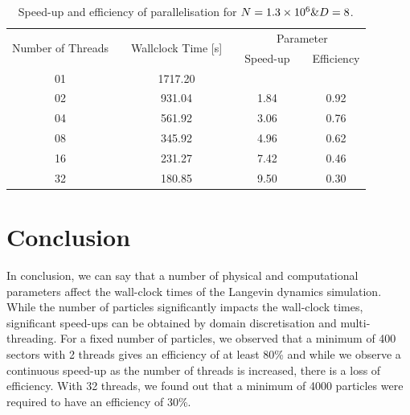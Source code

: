 \documentclass[11pt, oneside]{article}
\begin{document}
                \begin{table}[h]
  \caption{Speed-up and efficiency of parallelisation for $N = \num{1.3d6} \text{\&} D = 8$.}
  \label{tab:measures}
  \centering
  \begin{tabular}{ccccccc}
    \toprule
    \multirow{2}{*}{Number of Threads} &\phantom{abc} & \multirow{2}{*}{Wallclock Time [s]} &\phantom{abc} & \multicolumn{3}{c}{Parameter} \\
    \cmidrule{5-7}
    &\phantom{abc} & & \phantom{abc} & Speed-up & \phantom{abc} & {Efficiency}\\
    \midrule
    01 && 1717.20 && {} && {} \\
    02 && 931.04 && 1.84 && 0.92 \\
    04 && 561.92 && 3.06 && 0.76 \\
    08 && 345.92 && 4.96 && 0.62 \\
    16 && 231.27 && 7.42 && 0.46 \\
    32 && 180.85 && 9.50 && 0.30 \\
    \bottomrule
  \end{tabular}
\end{table}


\section{Conclusion}
     In conclusion, we can say that a number of physical and computational parameters affect the wall-clock times of the Langevin dynamics simulation. While the number of particles significantly impacts the wall-clock times, significant speed-ups can be obtained by domain discretisation and multi-threading. For a fixed number of particles, we observed that a minimum of 400 sectors with 2 threads gives an efficiency of at least 80\% and while we observe a continuous speed-up as the number of threads is increased, there is a loss of efficiency. With 32 threads, we found out that a minimum of 4000 particles were required to have an efficiency of 30\%.         



\end{document}
